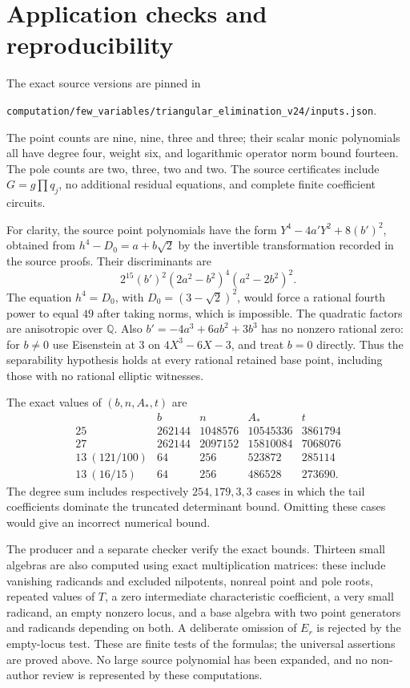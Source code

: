 \documentclass[11pt,a4paper]{article}
\newcommand{\Q}{\mathbb Q}\newcommand{\Z}{\mathbb Z}
\begin{document}
\section{Application checks and reproducibility}
The exact source versions are pinned in
\begin{center}\small
\nolinkurl{computation/few_variables/triangular_elimination_v24/inputs.json}.
\end{center}
The point counts are nine, nine, three and three; their scalar monic
polynomials all have degree four, weight six, and logarithmic operator
norm bound fourteen. The pole counts are two, three, two and two.
The source certificates include $G=g\prod q_j$, no additional residual
equations, and complete finite coefficient circuits.

For clarity, the source point polynomials have the form
$Y^4-4a'Y^2+8(b')^2$, obtained from $h^4-D_0=a+b\sqrt2$ by the
invertible transformation recorded in the source proofs. Their discriminants
are
\[
 2^{15}(b')^2(2a^2-b^2)^4(a^2-2b^2)^2.
\]
The equation $h^4=D_0$, with $D_0=(3-\sqrt2)^2$, would force a rational
fourth power to equal $49$ after taking norms, which is impossible.
The quadratic factors are anisotropic over $\Q$.
Also $b'=-4a^3+6ab^2+3b^3$ has no nonzero rational zero: for $b\ne0$
use Eisenstein at $3$ on $4X^3-6X-3$, and treat $b=0$ directly.
Thus the separability hypothesis holds at every rational retained base
point, including those with no rational elliptic witnesses.

The exact values of $(b,n,A_*,t)$ are
\[
\begin{array}{c|r|r|r|r}
 &b&n&A_*&t\\\hline
25&262144&1048576&10545336&3861794\\
27&262144&2097152&15810084&7068076\\
13\ (121/100)&64&256&523872&285114\\
13\ (16/15)&64&256&486528&273690.
\end{array}
\]
The degree sum includes respectively $254,179,3,3$ cases in which the
tail coefficients dominate the truncated determinant bound. Omitting these
cases would give an incorrect numerical bound.

The producer and a separate checker verify the exact bounds. Thirteen small
algebras are also computed using exact multiplication matrices: these
include vanishing radicands and excluded nilpotents, nonreal point and pole
roots, repeated values of $T$, a zero intermediate characteristic coefficient,
a very small radicand, an empty nonzero locus, and a base algebra with
two point generators and radicands depending on both. A deliberate omission of
$E_r$ is rejected by the empty-locus test. These are finite tests of the
formulas; the universal assertions are proved above. No large source
polynomial has been expanded, and no non-author review is represented by
these computations.
\end{document}
